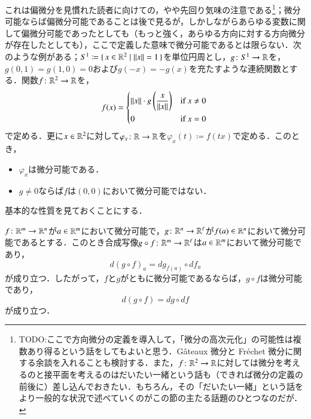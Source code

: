 \begin{que}
これは偏微分を見慣れた読者に向けての，やや先回り気味の注意である\footnote{TODO:ここで方向微分の定義を導入して，「微分の高次元化」の可能性は複数あり得るという話をしてもよいと思う．G\^ateaux 微分と Fr\'echet 微分に関する余談を入れることも検討する．また，$f \colon \mathbb{R}^2 \to \mathbb{R}$に対しては微分を考えるのと接平面を考えるのはだいたい一緒という話も（できれば微分の定義の前後に）差し込んでおきたい．もちろん，その「だいたい一緒」という話をより一般的な状況で述べていくのがこの節の主たる話題のひとつなのだが．}；微分可能ならば偏微分可能であることは後で見るが，しかしながらあらゆる変数に関して偏微分可能であったとしても（もっと強く，あらゆる方向に対する方向微分が存在したとしても），ここで定義した意味で微分可能であるとは限らない．次のような例がある；$S^1 \coloneqq \set{x \in \mathbb{R}^2 | \|x\|=1}$を単位円周とし，$g \colon S^1 \to \mathbb{R}$を，$g(0,1) = g(1,0) = 0$および$g(-x)=-g(x)$を充たすような連続関数とする．関数$f \colon \mathbb{R}^2 \to \mathbb{R}$を，
\begin{equation}
f(x) =   \begin{dcases*}
    \|x\| \cdot g\left( \frac{x}{\|x\|} \right) & if $x \neq 0$ \\
    0 & if $x=0$
  \end{dcases*}
\end{equation}
で定める．更に$x \in \mathbb{R}^2$に対して$\varphi_x \colon \mathbb{R} \to \mathbb{R}$を$\varphi_x(t) \coloneqq f(tx)$で定める．このとき，
\begin{itemize}
\item $\varphi_x$は微分可能である．
\item $g \neq 0$ならば$f$は$(0,0)$において微分可能ではない．
\end{itemize}
\end{que}

基本的な性質を見ておくことにする．

\begin{prop}
$f \colon \mathbb{R}^m \to \mathbb{R}^n$が$a \in \mathbb{R}^m$において微分可能で，$g \colon \mathbb{R}^n \to \mathbb{R}^\ell$が$f(a) \in \mathbb{R}^n$において微分可能であるとする．このとき合成写像$g \circ f \colon \mathbb{R}^m \to \mathbb{R}^\ell$は$a \in \mathbb{R}^m$において微分可能であり，
\begin{equation}
d(g \circ f)_{a} = dg_{f(a)} \circ df_a
\end{equation}が成り立つ．したがって，$f$と$g$がともに微分可能であるならば，$g \circ f$は微分可能であり，
\begin{equation}
d(g \circ f) = dg \circ df
\end{equation}が成り立つ．
\end{prop}

